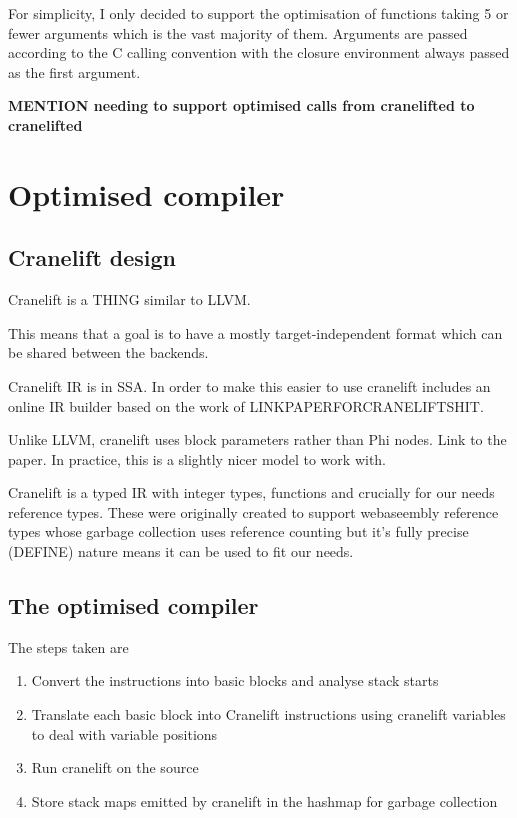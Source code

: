 For simplicity, I only decided to support the optimisation of functions taking 5 or fewer arguments
which is the vast majority of them. Arguments are passed according to the C calling convention with
the closure environment always passed as the first argument.

\textbf{MENTION needing to support optimised calls from cranelifted to cranelifted}

\section{Optimised compiler}

\subsection{Cranelift design}

Cranelift is a THING similar to LLVM.

This means that a goal is to have a mostly target-independent format which can be shared between
the backends.

Cranelift IR is in SSA. In order to make this easier to use cranelift includes an online IR builder
based on the work of LINKPAPERFORCRANELIFTSHIT.

Unlike LLVM, cranelift uses block parameters rather than Phi nodes. Link to the paper. In practice,
this is a slightly nicer model to work with.

Cranelift is a typed IR with integer types, functions and crucially for our needs reference types.
These were originally created to support webaseembly reference types whose garbage collection uses
reference counting but it's fully precise (DEFINE) nature means it can be used to fit our needs.

\subsection{The optimised compiler}

The steps taken are

\begin{enumerate}
      \item Convert the instructions into basic blocks and analyse stack starts
      \item Translate each basic block into Cranelift instructions using cranelift variables to
            deal
            with variable positions
      \item Run cranelift on the source
      \item Store stack maps emitted by cranelift in the hashmap for garbage collection
\end{enumerate}

